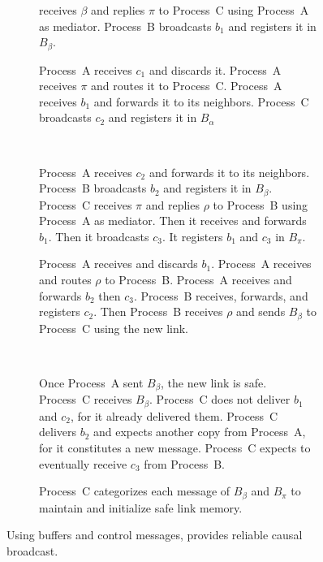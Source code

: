 \begin{figure}
\begin{center}
\begin{subfigure}[t]{0.48\textwidth}
{        receives $\beta$ and replies $\pi$ to Process~C using Process~A as
        mediator. Process~B broadcasts $b_1$ and registers it in $B_\beta$.}
    \end{subfigure}    
    \begin{subfigure}[t]{0.48\textwidth}
      \centering%
      \caption{\label{fig:solveF}Process~A receives $c_1$ and discards it.
        Process~A receives $\pi$ and routes it to Process~C. Process~A receives
        $b_1$ and forwards it to its neighbors. Process~C broadcasts $c_2$ and
        registers it in $B_\alpha$}
    \end{subfigure}
    ~
    \begin{subfigure}[t]{0.48\textwidth}
      \centering%
      \caption{\label{fig:solveG}Process~A receives $c_2$ and forwards it to
        its neighbors.  Process~B broadcasts $b_2$ and registers it in
        $B_\beta$. Process~C receives $\pi$ and replies $\rho$ to Process~B
        using Process~A as mediator. Then it receives and forwards $b_1$. Then
        it broadcasts $c_3$. It registers $b_1$ and $c_3$ in $B_\pi$.}
    \end{subfigure}
    \begin{subfigure}[t]{0.48\textwidth}
      \centering%
      \caption{\label{fig:solveH}Process~A receives and discards $b_1$.
        Process~A receives and routes $\rho$ to Process~B.  Process~A receives
        and forwards $b_2$ then $c_3$. Process~B receives, forwards, and
        registers $c_2$. Then Process~B receives $\rho$ and sends $B_\beta$ to
        Process~C using the new link.}
    \end{subfigure}
    ~
    \begin{subfigure}[t]{0.48\textwidth}
      \centering%
      \caption{\label{fig:solveI}Once Process~A sent $B_\beta$, the new link is
        safe.  Process~C receives $B_\beta$. Process~C does not deliver $b_1$
        and $c_2$, for it already delivered them. Process~C delivers $b_2$ and
        expects another copy from Process~A, for it constitutes a new message.
        Process~C expects to eventually receive $c_3$ from Process~B.}
    \end{subfigure}
    \begin{subfigure}[t]{0.99\textwidth}
      \centering%
      \caption{\label{fig:solveJ}Process~C categorizes each message of $B_\beta$
        and $B_\pi$ to maintain and initialize safe link memory.}
    \end{subfigure}
    \caption{\label{fig:solve}Using buffers and control messages, \RPCBROADCAST 
      provides reliable causal broadcast.}
  \end{center}
\end{figure}


